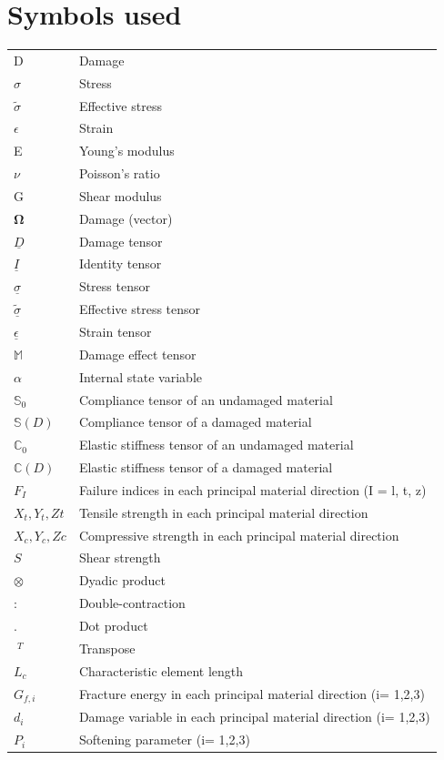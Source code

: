 \documentclass[12pt,a4paper,twoside,openright]{report}
\begin{document}
\section*{Symbols used}
\begin{longtable}{l l}
D &  Damage \\
$\sigma$ & Stress \\
$\tilde{\sigma}$ & Effective stress \\
$\epsilon$ & Strain \\
E  &  Young's modulus \\
$\nu$  &  Poisson's ratio \\
G &  Shear modulus \\
$\mathbf{\Omega}$  &  Damage (vector) \\
$\underline{D}$ &  Damage tensor \\
$\underline{I}$ &  Identity tensor  \\
$\underline{\sigma}$  &  Stress tensor \\
$\underline{\tilde{\sigma}}$  &  Effective stress tensor \\
$\underline{\epsilon}$  &  Strain tensor \\
$\mathbb{M}$  & Damage effect tensor  \\
$\alpha$  &  Internal state variable \\
$\mathbb{S}_{0}$  &  Compliance tensor of an undamaged material \\ 
$\mathbb{S}(D)$  &  Compliance tensor of a damaged material \\ 
$\mathbb{C}_{0}$  &  Elastic stiffness tensor of an undamaged material \\
$\mathbb{C}(D)$  &  Elastic stiffness tensor of a damaged material \\
$F_{I}$ & Failure indices in each principal material direction (I = l, t, z)\\
$X_{t}, Y_{t}, Z{t}$ & Tensile strength in each principal material direction \\ 
$X_{c}, Y_{c}, Z{c}$ & Compressive strength in each principal material direction \\ 
$S$ & Shear strength \\
$\otimes$ & Dyadic product \\
$:$ & Double-contraction \\
$.$ & Dot product \\
$\; ^{T}$ & Transpose \\ 
$L_{c}$ & Characteristic element length \\
$G_{f, i}$ & Fracture energy in each principal material direction (i= 1,2,3)\\
$d_{i}$  &  Damage variable in each principal material direction (i= 1,2,3)\\
$P_{i}$  & Softening parameter (i= 1,2,3)\\
\end{longtable}
\end{document}
